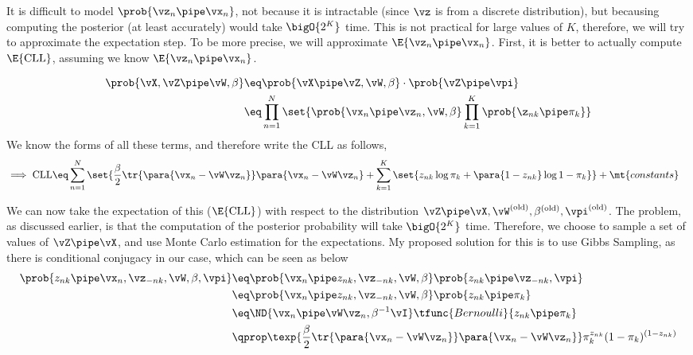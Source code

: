 \documentclass{article}
\begin{document}
\begin{question}

	\def\opi{\vpi^{\text{(old)}}}
	\def\oW{\vW^{\text{(old)}}}
	\def\obeta{\beta^{\text{(old)}}}
	\def\ovbeta{\para{\beta^{\text{(old)}}}^{-1}}

	\def\mleW{\vW_{\text{MLE}}}
	\def\mlebeta{\vbeta_{\text{MLE}}}
	\def\mlepi{\vpi_{\text{MLE}}}

	It is difficult to model $\prob{\vz_n \pipe \vx_n}$, not because it is intractable (since $\vz$ is from a discrete distribution), but becausing computing the posterior (at least accurately) would take $\bigO{2^K}$ time. This is not practical for large values of $K$, therefore, we will try to approximate the expectation step. To be more precise, we will approximate $\E{\vz_n \pipe \vx_n}$. First, it is better to actually compute $\E{\text{CLL}}$, assuming we know $\E{\vz_n \pipe \vx_n}$.

	\begin{align*}
		\prob{\vX, \vZ \pipe \vW, \beta}	&\eq	\prob{\vX \pipe \vZ, \vW, \beta} \cdot \prob{\vZ \pipe \vpi} \\
		&\eq	\prod_{n = 1}^N \set{\prob{\vx_n \pipe \vz_n, \vW, \beta} \prod_{k = 1}^K \prob{\z_{nk} \pipe \pi_k}} \\
	\end{align*}
	We know the forms of all these terms, and therefore write the CLL as follows,
	\begin{align*}
		\implies \text{CLL}	&\eq	\sum_{n = 1}^N \set{\frac{\beta}{2} \tr{\para{\vx_n - \vW \vz_n}} \para{\vx_n - \vW \vz_n} + \sum_{k = 1}^K \set{z_{nk} \log{\pi_k} + \para{1 - z_{nk}} \log{1 - \pi_k}}} + \mt{constants}
	\end{align*}

	We can now take the expectation of this ($\E{\text{CLL}}$) with respect to the distribution $\vZ \pipe \vX, \oW, \obeta, \opi$. The problem, as discussed earlier, is that the computation of the posterior probability will take $\bigO{2^K}$ time. Therefore, we choose to sample a set of values of $\vZ \pipe \vX$, and use Monte Carlo estimation for the expectations. My proposed solution for this is to use Gibbs Sampling, as there is conditional conjugacy in our case, which can be seen as below
	\begin{align*}
		\prob{z_{nk} \pipe \vx_n, \vz_{-nk}, \vW, \beta, \vpi}	&\eq	\prob{\vx_n \pipe z_{nk}, \vz_{-nk}, \vW, \beta} \prob{z_{nk} \pipe \vz_{-nk}, \vpi} \\
		&\eq	\prob{\vx_n \pipe z_{nk}, \vz_{-nk}, \vW, \beta} \prob{z_{nk} \pipe \pi_k} \\
		&\eq 	\ND{\vx_n \pipe \vW \vz_n, \beta^{-1} \vI} \tfunc{Bernoulli}{z_{nk} \pipe \pi_k} \\
		&\qprop	\texp{\frac{\beta}{2} \tr{\para{\vx_n - \vW \vz_n}} \para{\vx_n - \vW \vz_n}} \pi_k^{z_{nk}} (1 - \pi_k)^{(1 - z_{nk})}
	\end{align*}


\end{question}
\end{document}
